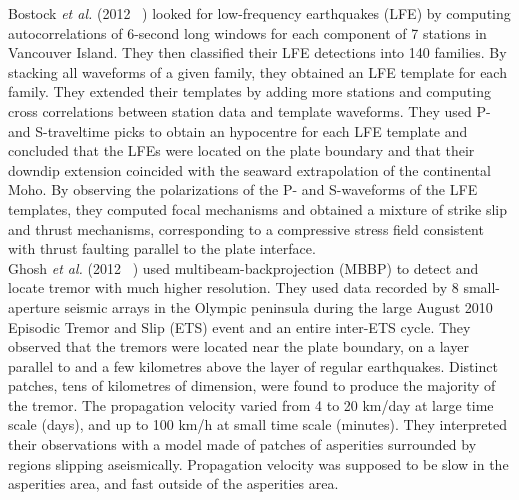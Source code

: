 \documentclass[main.tex]{subfiles}
\begin{document}
Bostock \textit{et al.} (2012 ~\cite{BOS_2012}) looked for low-frequency earthquakes (LFE) by computing autocorrelations of 6-second long windows for each component of 7 stations in Vancouver Island. They then classified their LFE detections into 140 families. By stacking all waveforms of a given family, they obtained an LFE template for each family. They extended their templates by adding more stations and computing cross correlations between station data and template waveforms. They used P- and S-traveltime picks to obtain an hypocentre for each LFE template and concluded that the LFEs were located on the plate boundary and that their downdip extension coincided with the seaward extrapolation of the continental Moho. By observing the polarizations of the P- and S-waveforms of the LFE templates, they computed focal mechanisms and obtained a mixture of strike slip and thrust mechanisms, corresponding to a compressive stress field consistent with thrust faulting parallel to the plate interface. \\

Ghosh \textit{et al.} (2012 ~\cite{GHO_2012}) used multibeam-backprojection (MBBP) to detect and locate tremor with much higher resolution. They used data recorded by 8 small-aperture seismic arrays in the Olympic peninsula during the large August 2010 Episodic Tremor and Slip (ETS) event and an entire inter-ETS cycle. They observed that the tremors were located near the plate boundary, on a layer parallel to and a few kilometres above the layer of regular earthquakes. Distinct patches, tens of kilometres of dimension, were found to produce the majority of the tremor. The propagation velocity varied from 4 to 20 km/day at large time scale (days), and up to 100 km/h at small time scale (minutes). They interpreted their observations with a model made of patches of asperities surrounded by regions slipping aseismically. Propagation velocity was supposed to be slow in the asperities area, and fast outside of the asperities area. \\
\end{document}
